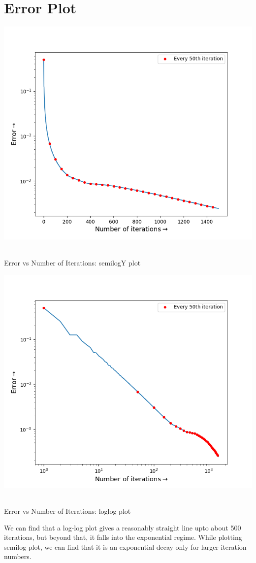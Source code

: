 \documentclass[12pt, a4paper]{report}
\begin{document}
\section*{Error Plot}
\begin{center}
	\includegraphics[scale=0.65]{Figure5} 
	\caption{\\Error vs Number of Iterations: semilogY plot}
	\label{fig:rawdata}
\end{center}
\begin{center}
	\includegraphics[scale=0.65]{Figure6} 
	\caption{\\Error vs Number of Iterations: loglog plot}
	\label{fig:rawdata}
\end{center}
We can find that a log-log plot gives a reasonably straight line upto about 500 iterations, but beyond that, it falls into the exponential regime. While plotting semilog plot, we can find that it is an exponential decay only for larger iteration numbers.
\end{document}
